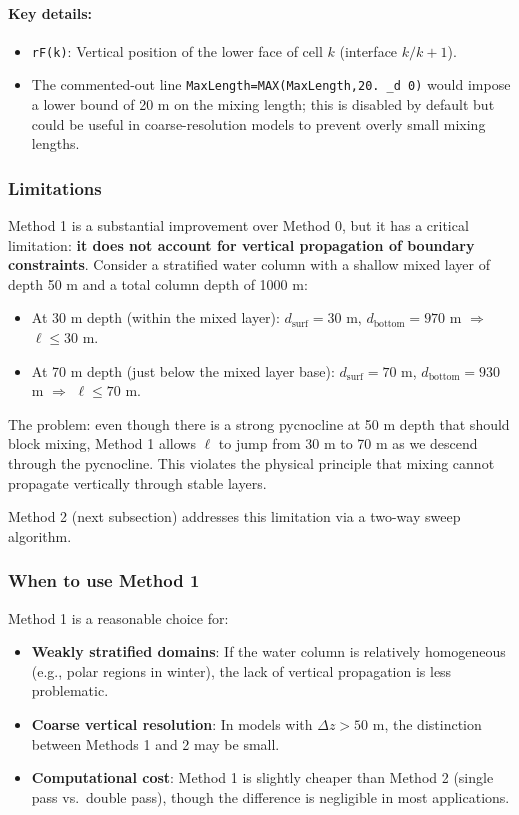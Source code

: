 \documentclass[12pt,letterpaper]{article}
\begin{document}
\paragraph{Key details:}
\begin{itemize}
\item \verb|rF(k)|: Vertical position of the lower face of cell $k$ (interface $k/k+1$).
\item The commented-out line \verb|MaxLength=MAX(MaxLength,20. _d 0)| would impose a lower bound of 20 m on the mixing length; this is disabled by default but could be useful in coarse-resolution models to prevent overly small mixing lengths.
\end{itemize}

\subsubsection{Limitations}

Method 1 is a substantial improvement over Method 0, but it has a critical limitation: \textbf{it does not account for vertical propagation of boundary constraints}. Consider a stratified water column with a shallow mixed layer of depth 50 m and a total column depth of 1000 m:

\begin{itemize}
\item At 30 m depth (within the mixed layer): $d_{\text{surf}} = 30$ m, $d_{\text{bottom}} = 970$ m $\Rightarrow$ $\ell \leq 30$ m.
\item At 70 m depth (just below the mixed layer base): $d_{\text{surf}} = 70$ m, $d_{\text{bottom}} = 930$ m $\Rightarrow$ $\ell \leq 70$ m.
\end{itemize}

The problem: even though there is a strong pycnocline at 50 m depth that should block mixing, Method 1 allows $\ell$ to jump from 30 m to 70 m as we descend through the pycnocline. This violates the physical principle that mixing cannot propagate vertically through stable layers.

Method 2 (next subsection) addresses this limitation via a two-way sweep algorithm.

\subsubsection{When to use Method 1}

Method 1 is a reasonable choice for:
\begin{itemize}
\item \textbf{Weakly stratified domains}: If the water column is relatively homogeneous (e.g., polar regions in winter), the lack of vertical propagation is less problematic.
\item \textbf{Coarse vertical resolution}: In models with $\Delta z > 50$ m, the distinction between Methods 1 and 2 may be small.
\item \textbf{Computational cost}: Method 1 is slightly cheaper than Method 2 (single pass vs.\ double pass), though the difference is negligible in most applications.
\end{itemize}
\end{document}
